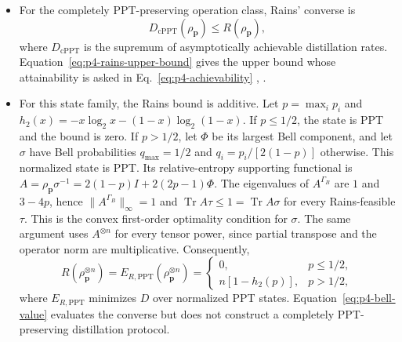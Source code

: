 \begin{itemize}
  \item For the completely PPT-preserving operation class, Rains' converse is
\begin{equation}
  D_{\mathrm{cPPT}}(\rho_{\mathbf p})\leq R(\rho_{\mathbf p}),
  \label{eq:p4-rains-upper-bound}
\end{equation}
where $D_{\mathrm{cPPT}}$ is the supremum of asymptotically achievable
distillation rates. Equation~\eqref{eq:p4-rains-upper-bound} gives the upper
bound whose attainability is asked in Eq.~\eqref{eq:p4-achievability}
,
.

  \item For this state family, the Rains bound is additive. Let
$p=\max_i p_i$ and $h_2(x)=-x\log_2x-(1-x)\log_2(1-x)$.
If $p\leq1/2$, the state is PPT and the bound is zero. If $p>1/2$, let
$\Phi$ be its largest Bell component, and let $\sigma$ have Bell
probabilities $q_{\max}=1/2$ and $q_i=p_i/[2(1-p)]$ otherwise.
This normalized state is PPT. Its relative-entropy supporting functional is
$A=\rho_{\mathbf p}\sigma^{-1}=2(1-p)I+2(2p-1)\Phi$.
The eigenvalues of $A^{\Gamma_B}$ are $1$ and $3-4p$, hence
$\|A^{\Gamma_B}\|_\infty=1$ and
$\operatorname{Tr}A\tau\leq1=\operatorname{Tr}A\sigma$ for every
Rains-feasible $\tau$. This is the convex first-order optimality condition
for $\sigma$. The same argument uses $A^{\otimes n}$ for every tensor
power, since partial transpose and the operator norm are multiplicative.
Consequently,
\begin{equation}
  R(\rho_{\mathbf p}^{\otimes n})
   =E_{R,\mathrm{PPT}}(\rho_{\mathbf p}^{\otimes n})
   =\begin{cases}0,&p\leq1/2,\\ n[1-h_2(p)],&p>1/2,
     \end{cases}
  \label{eq:p4-bell-value}
\end{equation}
where $E_{R,\mathrm{PPT}}$ minimizes $D$ over normalized PPT states.
Equation~\eqref{eq:p4-bell-value} evaluates the converse but does not
construct a completely PPT-preserving distillation protocol.


\end{itemize}
